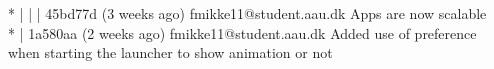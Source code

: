 * | | | 45bd77d (3 weeks ago) fmikke11@student.aau.dk Apps are now scalable\\
* | 1a580aa (2 weeks ago) fmikke11@student.aau.dk Added use of preference when starting the launcher to show animation or not\\